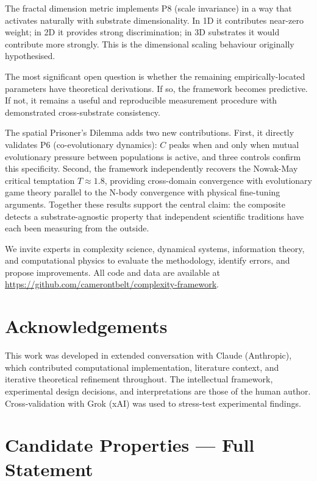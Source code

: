 \documentclass[12pt,a4paper]{article}
\begin{document}
The fractal dimension metric implements P8 (scale invariance) in a
way that activates naturally with substrate dimensionality.
In 1D it contributes near-zero weight; in 2D it provides strong
discrimination; in 3D substrates it would contribute more strongly.
This is the dimensional scaling behaviour originally hypothesised.

The most significant open question is whether the remaining
empirically-located parameters have theoretical derivations.
If so, the framework becomes predictive.
If not, it remains a useful and reproducible measurement procedure
with demonstrated cross-substrate consistency.

The spatial Prisoner's Dilemma adds two new contributions.
First, it directly validates P6 (co-evolutionary dynamics): $C$ peaks
when and only when mutual evolutionary pressure between populations is
active, and three controls confirm this specificity.
Second, the framework independently recovers the Nowak-May critical
temptation $T\!\approx\!1.8$, providing cross-domain convergence with
evolutionary game theory parallel to the N-body convergence with
physical fine-tuning arguments.
Together these results support the central claim: the composite detects
a substrate-agnostic property that independent scientific traditions
have each been measuring from the outside.

We invite experts in complexity science, dynamical systems,
information theory, and computational physics to evaluate the
methodology, identify errors, and propose improvements.
All code and data are available at
\url{https://github.com/camerontbelt/complexity-framework}.

\section*{Acknowledgements}

This work was developed in extended conversation with Claude
(Anthropic), which contributed computational implementation,
literature context, and iterative theoretical refinement throughout.
The intellectual framework, experimental design decisions, and
interpretations are those of the human author.
Cross-validation with Grok (xAI) was used to stress-test
experimental findings.

\appendix
\section{Candidate Properties --- Full Statement}
\end{document}

